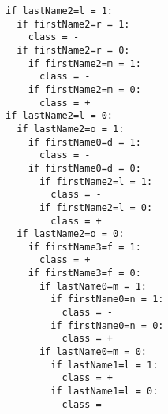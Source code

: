 \begin{verbatim}
if lastName2=l = 1:
  if firstName2=r = 1: 
    class = -
  if firstName2=r = 0:
    if firstName2=m = 1: 
      class = -
    if firstName2=m = 0: 
      class = +
if lastName2=l = 0:
  if lastName2=o = 1:
    if firstName0=d = 1: 
      class = -
    if firstName0=d = 0:
      if firstName2=l = 1: 
        class = -
      if firstName2=l = 0: 
        class = +
  if lastName2=o = 0:
    if firstName3=f = 1: 
      class = +
    if firstName3=f = 0:
      if lastName0=m = 1:
        if firstName0=n = 1: 
          class = -
        if firstName0=n = 0: 
          class = +
      if lastName0=m = 0:
        if lastName1=l = 1: 
          class = +
        if lastName1=l = 0: 
          class = -
\end{verbatim}